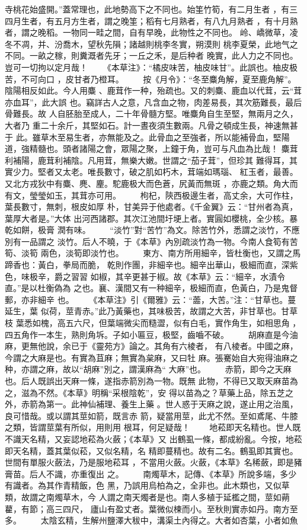 \documentclass{ctexart}
\begin{document}
寺桃花始盛開。''蓋常理也，此地勢高下之不同也。始筀竹筍，有二月生者 ，有三四月生者，有五月方生者，謂之晚筀；稻有七月熟者，有八九月熟者 ，有十月熟者，謂之晚稻。一物同一畦之間，自有早晚，此物性之不同也。 岭、嶠微草，凌冬不凋，并、汾喬木，望秋先隕；諸越則桃李冬實，朔漠則 桃李夏榮，此地气之不同。一畝之稼，則糞溉者先牙；一丘之禾，是后种者 晚實，此人力之不同也。豈可一切拘以定月哉！ 　　《本草注》：``橘皮味苦，柚皮味甘''。此誤也。柚皮极苦，不可向口 ，皮甘者乃橙耳。 　　按《月令》：``冬至麋角解，夏至鹿角解''。陰陽相反如此。今人用麋 、鹿茸作一种，殆疏也。又的刺麋、鹿血以代茸，云``茸亦血耳''，此大誤 也。竊詳古人之意，凡含血之物，肉差易長，其次筋難長，最后骨難長。故 人自胚胎至成人，二十年骨髓方堅。唯麋角自生至堅，無兩月之久，大者乃 重二十余斤，其堅如石。計一晝夜須生數兩。凡骨之頓成生長，神速無甚于 此。雖草木至易生者，亦無能及之。此骨血之至強者，所以能補骨血，堅陽 道，強精髓也。頭者諸陽之會，眾陽之聚，上鐘于角，豈可与凡血為比哉！ 麋茸利補陽，鹿茸利補陰。凡用茸，無樂大嫩。世謂之``茄子茸''，但珍其 難得耳，其實少力。堅者又太老。唯長數寸，破之肌如朽木，茸端如瑪瑙、 紅玉者，最善。又北方戎狄中有麋、麂、麈。駝鹿极大而色蒼，尻黃而無斑 ，亦鹿之類。角大而有文，瑩瑩如玉，其茸亦可用。 　　枸杞，陝西极邊生者，高丈余，大可作柱，葉長數寸，無刺，根皮如厚 朴，甘美异于他處者。《千金翼》云：``甘州者為真，葉厚大者是。''大体 出河西諸郡。其次江池間圩埂上者。實圓如櫻桃，全少核。暴乾如餅，极膏 潤有味。 　　``淡竹''對``苦竹''為文。除苦竹外，悉謂之淡竹，不應別有一品謂之 淡竹。后人不曉，于《本草》內別疏淡竹為一物。今南人食筍有苦筍、淡筍 兩色，淡筍即淡竹也。 　　東方、南方所用細辛，皆杜衡也，又謂之馬蹄香也：黃白，拳局而脆， 乾則作團，非細辛也。細辛出華山，极細而直，深紫色，味极辛，爵之習習 如椒，其辛更甚于椒。故《本草》云：``細辛，水漬令直。''是以杜衡偽為 之也。襄、漢間又有一种細辛，极細而直，色黃白，乃是鬼督郵，亦非細辛 也。 　　《本草注》引《爾雅》云：``蘦，大苦。''注：``甘草也。蔓延生，葉 似荷，莖青赤。''此乃黃藥也，其味极苦，故謂之大苦，非甘草也。甘草枝 葉悉如槐，高五六尺，但葉端微尖而糙澀，似有白毛，實作角生，如相思角 ，四五角作一本生，熟則角坼。子如小匾豆，极堅，齒嚙不破。 　　胡麻直是今油麻，更無他說，余已于《靈苑方》論之。其角有六棱者， 有八棱者。中國之麻，今謂之大麻是也。有實為苴麻；無實為枲麻，又曰牡 麻。張騫始自大宛得油麻之种，亦謂之麻，故以``胡麻''別之，謂漢麻為`` 大麻''也。 　　赤箭，即今之天麻也。后人既誤出天麻一條，遂指赤箭別為一物。既無 此物，不得已又取天麻苗為之，滋為不然。《本草》明稱``采根陰乾''，安 得以苗為之？草藥上品，除五芝之外，赤箭為第一。此神仙補理、養生上藥 。世人惑于天麻之說，遂止用之治風，良可惜哉。或以謂其莖如箭，既言赤 箭，疑當用莖，此尤不然。至如鳶尾、牛膝之類，皆謂莖葉有所似，用則用 根耳，何足疑哉！ 　　地菘即天名精也。世人既不識天名精，又妄認地菘為火蘞；《本草》又 出鶴虱一條，都成紛亂。今按，地菘即天名精，蓋其葉似菘，又似名精，名 精即蔓精也。故有二名。鶴虱即其實也。世間有單服火蘞法，乃是服地菘耳 ，不當用火蘞。火蘞，《本草》名稀蘞，即是豬膏苗。后人不識，亦重復出 之。 　　南燭草木，記傳、《本草》所說多端，多少有識者。為其作青精飯，色 黑，乃誤用烏柏為之，全非也。此木類也，又似草類，故謂之南燭草木，今 人謂之南天燭者是也。南人多植于延檻之間，莖如蒴藋，有節；高三四尺， 廬山有盈丈者。葉微似楝而小。至秋則實赤如丹。南方至多。 　　太陰玄精，生解州鹽澤大秡中，溝渠土內得之。大者如杏葉，小者如魚 
\end{document}
